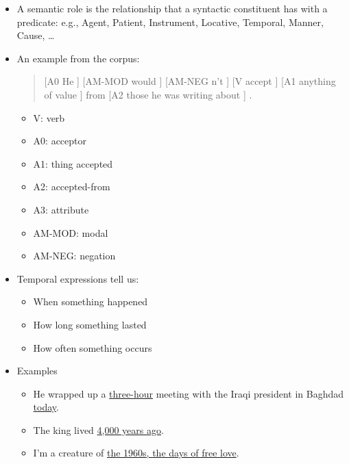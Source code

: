 \documentclass[a4paper,landscape,headrule,footrule,xetex]{foils}
\begin{document}
\begin{itemize}
\item A semantic role is the relationship that a syntactic constituent
  has with a predicate: e.g., Agent, Patient, Instrument, Locative,
  Temporal, Manner, Cause, \ldots
\item An example from the  corpus:
  \begin{quote}
  [A0 He ] [AM-MOD would ] [AM-NEG n't ] [V accept ] [A1 anything of value ] from [A2 those he was writing about ] . 
  \end{quote}
  \begin{itemize}
  \item V: verb
  \item  A0: acceptor
  \item  A1: thing accepted
  \item  A2: accepted-from
  \item  A3: attribute
  \item  AM-MOD: modal
  \item  AM-NEG: negation 
  \end{itemize}
\end{itemize}


\begin{itemize}
\item Temporal expressions tell us:
  \begin{itemize}
  \item When something happened
  \item How long something lasted
  \item How often something occurs
  \end{itemize}
\item Examples
  \begin{itemize}
  \item  He wrapped up a \ul{three-hour} meeting with the Iraqi president in
    Baghdad \ul{today}.
  \item The king lived \ul{4,000 years ago}.
  \item I’m a creature of \ul{the 1960s, the days of free love}.
  \end{itemize}
\end{itemize}
\end{document}
